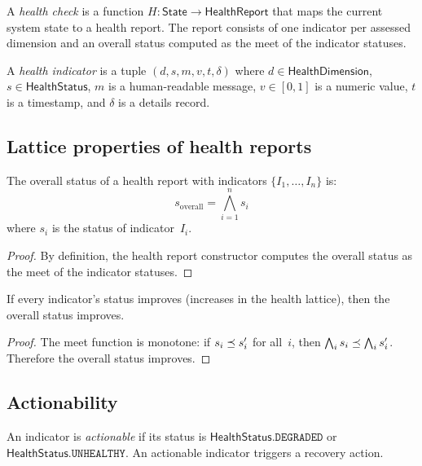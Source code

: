 \documentclass[11pt]{article}
\newcommand{\HealthRep}{\mathsf{HealthReport}}
\newcommand{\HealthDim}{\mathsf{HealthDimension}}
\newcommand{\HealthStat}{\mathsf{HealthStatus}}
\begin{document}
\begin{definition}\label{def:healthcheck}
A \emph{health check} is a function
$H \colon \mathsf{State} \to \HealthRep$
that maps the current system state to a health report.
The report consists of one indicator per assessed dimension
and an overall status computed as the meet of the indicator
statuses.
\end{definition}

\begin{definition}[Indicator]\label{def:indicator}
A \emph{health indicator} is a tuple
$(d, s, m, v, t, \delta)$ where $d \in \HealthDim$,
$s \in \HealthStat$, $m$ is a human-readable message,
$v \in [0,1]$ is a numeric value, $t$ is a timestamp,
and $\delta$ is a details record.
\end{definition}

\subsection{Lattice properties of health reports}

\begin{lemma}\label{lem:overallmeet}
The overall status of a health report with indicators
$\{I_1, \ldots, I_n\}$ is:
\[
  s_{\mathrm{overall}} = \bigwedge_{i=1}^n s_i
\]
where $s_i$ is the status of indicator~$I_i$.
\end{lemma}
\begin{proof}
By definition, the health report constructor computes the
overall status as the meet of the indicator statuses.
\end{proof}

\begin{lemma}\label{lem:healthmono}
If every indicator's status improves (increases in the
health lattice), then the overall status improves.
\end{lemma}
\begin{proof}
The meet function is monotone: if $s_i \preceq s_i'$ for
all~$i$, then $\bigwedge_i s_i \preceq \bigwedge_i s_i'$.
Therefore the overall status improves.
\end{proof}

\subsection{Actionability}

\begin{definition}\label{def:actionable}
An indicator is \emph{actionable} if its status is
$\HealthStat.\texttt{DEGRADED}$ or
$\HealthStat.\texttt{UNHEALTHY}$.
An actionable indicator triggers a recovery action.
\end{definition}
\end{document}
